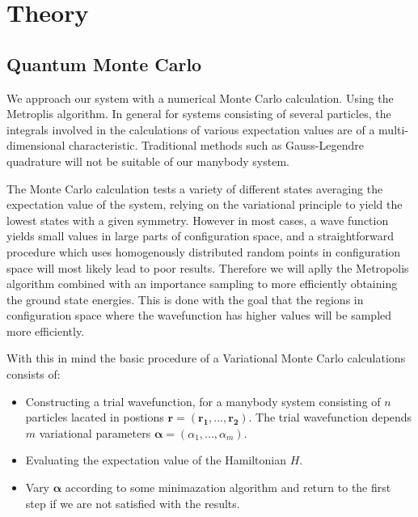 \documentclass[a4paper, 10pt, english]{revtex4-2} %
\begin{document}
    
\section{\large Theory}
    \subsection*{Quantum Monte Carlo}
        We approach our system with a numerical Monte Carlo calculation.
        Using the Metroplis algorithm.
        In general for systems consisting of several particles, the integrals involved in the calculations of various expectation values are of a multi-dimensional characteristic.
        Traditional methods such as Gauss-Legendre quadrature will not be suitable of our manybody system.

        The Monte Carlo calculation tests a variety of different states averaging the expectation value of the system, relying on the variational principle to yield the lowest states with a given symmetry.
        However in most cases, a wave function yields small values in large parts of configuration space, and a straightforward procedure which uses homogenously distributed random points in configuration space will most likely lead to poor results. 
        Therefore we will aplly the Metropolis algorithm combined with an importance sampling to more efficiently obtaining the ground state energies.
        This is done with the goal that the regions in configuration space where the wavefunction has higher values will be sampled more efficiently.

        With this in mind the basic procedure of a Variational Monte Carlo calculations consists of:
        \begin{itemize}
            \item Constructing a trial wavefunction, for a manybody system consisting of $n$ particles lacated in postions $\mathbf{r = (\mathbf{r}_1,...,\mathbf{r}_2)}$. The trial wavefunction depends $m$ variational parameters $\mathbf{\alpha} = (\alpha_1,...,\alpha_m)$.
            \item Evaluating the expectation value of the Hamiltonian $H$.
            \item Vary $\mathbf{\alpha}$ according to some minimazation algorithm and return to the first step if we are not satisfied with the results.
        \end{itemize}
        
\end{document}
